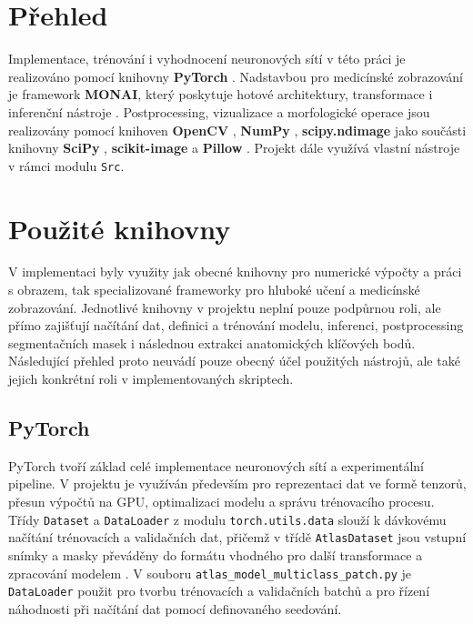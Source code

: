 \documentclass[male,czech,api_bc]{kitheses}
\begin{document}
\section{Přehled}
Implementace, trénování i vyhodnocení neuronových sítí v této práci je realizováno pomocí knihovny \textbf{PyTorch} \cite{Paszke2019PyTorch}. Nadstavbou pro medicínské zobrazování je framework \textbf{MONAI}, který poskytuje hotové architektury, transformace i inferenční nástroje \cite{Cardoso2022MONAI}. Postprocessing, vizualizace a morfologické operace jsou realizovány pomocí knihoven \textbf{OpenCV} \cite{Bradski2000OpenCV}, \textbf{NumPy} \cite{Harris2020NumPy}, \textbf{scipy.ndimage} jako součásti knihovny \textbf{SciPy} \cite{Virtanen2020SciPy}, \textbf{scikit-image} \cite{VanDerWalt2014Skimage} a \textbf{Pillow} \cite{PillowDocs}. Projekt dále využívá vlastní nástroje v rámci modulu \texttt{Src}.


\section{Použité knihovny}

V implementaci byly využity jak obecné knihovny pro numerické výpočty a práci s obrazem, tak specializované frameworky pro hluboké učení a medicínské zobrazování. Jednotlivé knihovny v projektu neplní pouze podpůrnou roli, ale přímo zajišťují načítání dat, definici a trénování modelu, inferenci, postprocessing segmentačních masek i následnou extrakci anatomických klíčových bodů. Následující přehled proto neuvádí pouze obecný účel použitých nástrojů, ale také jejich konkrétní roli v implementovaných skriptech.

\subsection*{PyTorch}
PyTorch tvoří základ celé implementace neuronových sítí a experimentální pipeline. V projektu je využíván především pro reprezentaci dat ve formě tenzorů, přesun výpočtů na GPU, optimalizaci modelu a správu trénovacího procesu. Třídy \texttt{Dataset} a \texttt{Data\-Loader} z modulu \texttt{torch.utils.data} slouží k dávkovému načítání trénovacích a validačních dat, přičemž v třídě \texttt{AtlasDataset} jsou vstupní snímky a masky převáděny do formátu vhodného pro další transformace a zpracování modelem \cite{PyTorchDataLoader}. V souboru \texttt{atlas\_model\_multiclass\_patch.py} je \texttt{Data\-Loader} použit pro tvorbu trénovacích a validačních batchů a pro řízení náhodnosti při načítání dat pomocí definovaného seedování.
\end{document}
